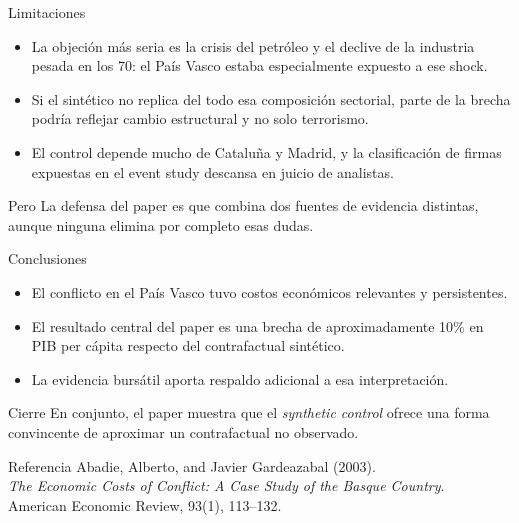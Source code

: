 \documentclass[aspectratio=1610]{beamer}
\begin{document}
\begin{frame}{Limitaciones}
    \begin{itemize}
        \item La objeción más seria es la crisis del petróleo y el declive de la industria pesada en los 70: el País Vasco estaba especialmente expuesto a ese shock.
        \item Si el sintético no replica del todo esa composición sectorial, parte de la brecha podría reflejar cambio estructural y no solo terrorismo.
        \item El control depende mucho de Cataluña y Madrid, y la clasificación de firmas expuestas en el event study descansa en juicio de analistas.
    \end{itemize}
    \begin{block}{Pero}
        La defensa del paper es que combina dos fuentes de evidencia distintas, aunque ninguna elimina por completo esas dudas.
    \end{block}
\end{frame}

\begin{frame}{Conclusiones}
    \begin{itemize}
        \item El conflicto en el País Vasco tuvo costos económicos relevantes y persistentes.
        \item El resultado central del paper es una brecha de aproximadamente 10\% en PIB per cápita respecto del contrafactual sintético.
        \item La evidencia bursátil aporta respaldo adicional a esa interpretación.
    \end{itemize}
    \begin{alertblock}{Cierre}
        En conjunto, el paper muestra que el \emph{synthetic control} ofrece una forma convincente de aproximar un contrafactual no observado.
    \end{alertblock}
\end{frame}

\begin{frame}{Referencia}
    \small
    Abadie, Alberto, and Javier Gardeazabal (2003).\\
    \emph{The Economic Costs of Conflict: A Case Study of the Basque Country}.\\
    American Economic Review, 93(1), 113--132.
\end{frame}
\end{document}
